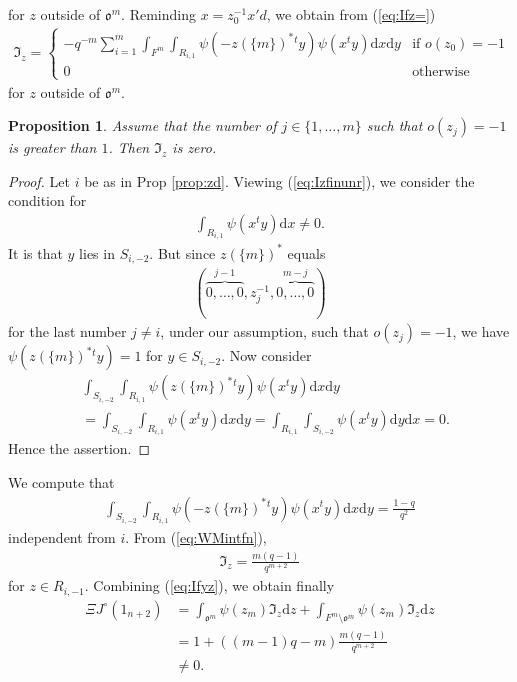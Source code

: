 \documentclass[11pt]{amsart}
\newcommand\oo{\mathfrak{o}}
\newcommand\If{\mathfrak{I}}
\newcommand\dr{\mathrm{d}}
\newcommand\1{\mathbf{1}}
\newcommand\nid{\noindent}
\numberwithin{equation}{section}
\newtheorem{prop}[thm]{Proposition}
\begin{document}
for $z$ outside of $\oo^m$.
Reminding $x = z_0^{-1}x'd$, we obtain from (\ref{eq:Ifz=}) 
\begin{align}
\If_z = 
\begin{cases}
- q^{-m} \sum_{i=1}^m \int_{F^m}\int_{R_{i,1}}\psi(- z(\{m\})^* {}^t  y) \psi(x{}^ty) \dr x \dr y & \mbox{if $o(z_0) = -1$} \\
0 & \mbox{otherwise} 
\end{cases}
\label{eq:Izfinunr}
\end{align}
for $z$ outside of $\oo^m$.
\begin{prop}\label{prop:}
Assume that the number of $j \in \{1, \ldots, m\}$ such that $o(z_j) = -1$ is greater than $1$. 
Then $\If_z$ is zero. 
\end{prop}
\begin{proof}
Let $i$ be as in Prop \ref{prop:zd}.
Viewing (\ref{eq:Izfinunr}), we consider the condition for 
\begin{align*}
\int_{R_{i,1}} \psi(x{}^ty) \dr x \neq 0.
\end{align*} 
It is that $y$ lies in $S_{i,-2}$. 
But since $z(\{m\})^*$ equals
\begin{align*}
 (\overbrace{0, \ldots, 0}^{j-1}, z_j^{-1}, \overbrace{0, \ldots, 0}^{m-j})
\end{align*} 
for the last number $j \neq i$, under our assumption, such that $o(z_j) = -1$, we have $\psi(z(\{m\})^*{}^ty) = 1$ for $y \in S_{i,-2}$. 
Now consider 
\begin{align*}
& \int_{S_{i,-2}} \int_{R_{i,1}} \psi(z(\{m\})^*{}^ty) \psi(x{}^ty) \dr x \dr y \\
&= \int_{S_{i,-2}} \int_{R_{i,1}} \psi(x{}^ty) \dr x \dr y = \int_{R_{i,1}} \int_{S_{i,-2}}  \psi(x{}^ty)  \dr y \dr x = 0.
\end{align*}
Hence the assertion.
\end{proof}
\nid
We compute that 
\begin{align*}
\int_{S_{i,-2}} \int_{R_{i,1}} \psi(- z(\{m\})^* {}^t  y) \psi(x{}^ty) \dr x \dr y = \frac{1-q}{q^2}
\end{align*} 
independent from $i$.
From (\ref{eq:WMintfn}),  
\begin{align*}
\If_z = \frac{m(q-1)}{q^{m+2}}
\end{align*} 
for $z \in R_{i,-1}$.
Combining (\ref{eq:Ifyz}), we obtain finally 
\begin{align*}
\Xi J^\circ(1_{n+2}) &= \int_{\oo^m} \psi(z_m) \If_z \dr z + \int_{F^m \setminus \oo^m} \psi(z_m) \If_z \dr z \\
&= 1 + ((m-1)q - m)\frac{m(q-1)}{q^{m+2}} \\
& \neq 0.
\end{align*} 
\end{document}
